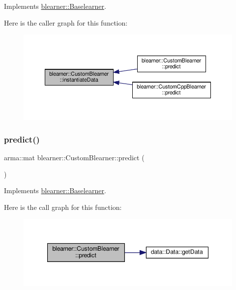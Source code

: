 Implements \hyperlink{classblearner_1_1_baselearner_af01f1b8c4540927705ff79c3649489f7}{blearner\+::\+Baselearner}.

Here is the caller graph for this function\+:\nopagebreak
\begin{figure}[H]
\begin{center}
\leavevmode
\includegraphics[width=350pt]{classblearner_1_1_custom_blearner_a18971368219f6948456b8e60c20b6968_icgraph}
\end{center}
\end{figure}
\mbox{\label{classblearner_1_1_custom_blearner_a20b5fe06512aa73478b9f934e1c81c31}} 
\subsubsection{\texorpdfstring{predict()}{predict()}\hspace{0.1cm}{\footnotesize\ttfamily [1/2]}}
{\footnotesize\ttfamily arma\+::mat blearner\+::\+Custom\+Blearner\+::predict (\begin{DoxyParamCaption}{ }\end{DoxyParamCaption})\hspace{0.3cm}{\ttfamily [virtual]}}



Implements \hyperlink{classblearner_1_1_baselearner_ab37986047db43c84420fef2cef7fc20d}{blearner\+::\+Baselearner}.

Here is the call graph for this function\+:\nopagebreak
\begin{figure}[H]
\begin{center}
\leavevmode
\includegraphics[width=347pt]{classblearner_1_1_custom_blearner_a20b5fe06512aa73478b9f934e1c81c31_cgraph}
\end{center}
\end{figure}
\mbox{\label{classblearner_1_1_custom_blearner_a401a479834eb3896260cb57b4551ceb4}} 
